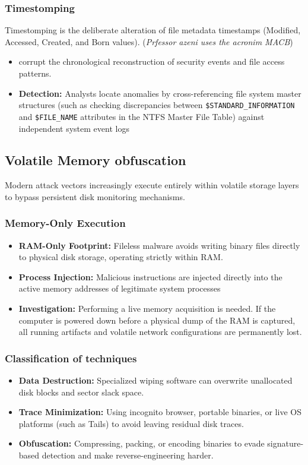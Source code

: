 \subsubsection*{Timestomping}
Timestomping is the deliberate alteration of file metadata timestamps (Modified, Accessed, Created, and Born values). (\textit{Prfessor azeni uses the acronim MACB})
\begin{itemize}
    \item corrupt the chronological reconstruction of security events and file access patterns.
    \item \textbf{Detection:} Analysts locate anomalies by cross-referencing file system master structures (such as checking discrepancies between \texttt{\$STANDARD\_INFORMATION} and \texttt{\$FILE\_NAME} attributes in the NTFS Master File Table) against independent system event logs
\end{itemize}

\subsection{Volatile Memory obfuscation}
 
Modern attack vectors increasingly execute entirely within volatile storage layers to bypass persistent disk monitoring mechanisms.

\subsubsection*{Memory-Only Execution}
\begin{itemize}
    \item \textbf{RAM-Only Footprint:} Fileless malware avoids writing binary files directly to physical disk storage, operating strictly within RAM.
    \item \textbf{Process Injection:} Malicious instructions are injected directly into the active memory addresses of legitimate system processes 
    \item \textbf{Investigation:} Performing a live memory acquisition is needed. If the computer is powered down before a physical dump of the RAM is captured, all running artifacts and volatile network configurations are permanently lost.
\end{itemize}

\subsubsection*{Classification of techniques}
\begin{itemize}
    \item \textbf{Data Destruction:} Specialized wiping software can overwrite unallocated disk blocks and sector slack space.
    \item \textbf{Trace Minimization:} Using incognito browser, portable binaries, or live OS platforms (such as Tails) to avoid leaving residual disk traces.
    \item \textbf{Obfuscation:} Compressing, packing, or encoding binaries to evade signature-based detection and make reverse-engineering harder.
\end{itemize}

